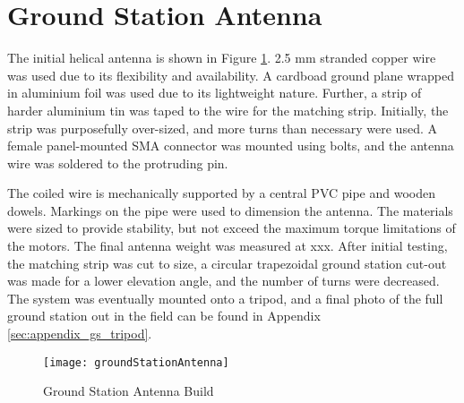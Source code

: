 \graphicspath{{./figures}}

\section{Ground Station Antenna}

The initial helical antenna is shown in Figure \ref{fig:groundStationAntenna}. 2.5 mm stranded copper wire was used due to its flexibility and availability. A cardboad ground plane wrapped in aluminium foil was used due to its lightweight nature. Further, a strip of harder aluminium tin was taped to the wire for the matching strip. Initially, the strip was purposefully over-sized, and more turns than necessary were used. A female panel-mounted SMA connector was mounted using bolts, and the antenna wire was soldered to the protruding pin.

The coiled wire is mechanically supported by a central PVC pipe and wooden dowels. Markings on the pipe were used to dimension the antenna. The materials were sized to provide stability, but not exceed the maximum torque limitations of the motors. The final antenna weight was measured at xxx. After initial testing, the matching strip was cut to size, a circular trapezoidal ground station cut-out was made for a lower elevation angle, and the number of turns were decreased. The system was eventually mounted onto a tripod, and a final photo of the full ground station out in the field can be found in Appendix \ref{sec:appendix_gs_tripod}.

\begin{figure}[!htb]
  \centering
  \texttt{[image: groundStationAntenna]}
  \caption{Ground Station Antenna Build}
  \label{fig:groundStationAntenna}
\end{figure}